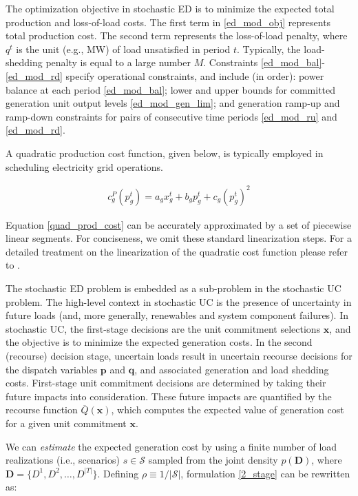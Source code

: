 \documentclass[conference]{IEEEtran}
\begin{document}
The optimization objective in stochastic ED is to minimize the expected total
production and loss-of-load costs. The first term in \eqref{ed_mod_obj}
represents total production cost.  The second term represents the
loss-of-load penalty, where $q^t$ is the unit (e.g., MW) of load unsatisfied
in period $t$.  Typically, the load-shedding penalty is equal to a 
large number $M$. Constraints \eqref{ed_mod_bal}-\eqref{ed_mod_rd}
specify operational constraints, and include (in order):
power balance at each period \eqref{ed_mod_bal}; lower and upper
bounds for committed generation unit output levels
\eqref{ed_mod_gen_lim}; and generation ramp-up and ramp-down
constraints for pairs of consecutive time periods \eqref{ed_mod_ru}
and \eqref{ed_mod_rd}.

A quadratic production cost function, given below, is typically employed in scheduling electricity
grid operations.

\begin{align}
c^P_g(p_g^t) = a_g x_g^t + b_g p_g^t + c_g (p_g^t )^2 \label{quad_prod_cost}
\end{align}

Equation \eqref{quad_prod_cost} can be accurately approximated by a set 
of piecewise linear segments.  For conciseness, we omit these standard
linearization steps.  For a detailed treatment on the linearization of the
quadratic cost function please refer to \cite{carrionarroyo06}.

The stochastic ED problem is embedded as a sub-problem in the stochastic
UC problem. The high-level context in stochastic UC is the presence of 
uncertainty in future loads (and, more generally, renewables and system 
component failures). In stochastic UC, the first-stage decisions are the 
unit commitment selections $\boldsymbol x$, and the objective is to 
minimize the expected generation costs. In the second (recourse) decision
stage, uncertain loads result in uncertain recourse decisions for the dispatch
variables $\boldsymbol p$ and $\boldsymbol q$, and associated generation 
and load shedding costs. First-stage unit commitment decisions
are determined by taking their future impacts into consideration.  These future 
impacts are quantified by the recourse function $\overline Q(\boldsymbol x)$,
which computes the expected value of generation cost for a given unit commitment 
$\boldsymbol x$. 

We can \emph{estimate} the expected generation cost by using a finite number of
load realizations (i.e., scenarios) $s \in \mathcal S$ sampled from the 
joint density $p(\boldsymbol D)$, where
$\boldsymbol D=\{D^1, D^2, \ldots, D^{|T|}\}$.
Defining $\rho \equiv 1/|\mathcal S|$, formulation \eqref{2_stage} 
can be rewritten as:
\end{document}
